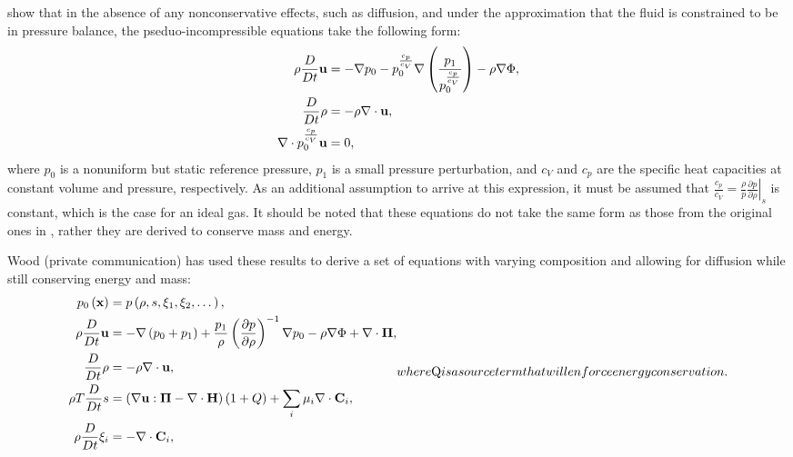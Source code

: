 \citet{Vasil2013} show that in the absence of any nonconservative effects, such as diffusion, and under the approximation that the fluid is constrained to be in pressure balance, the pseduo-incompressible equations take the following form:
\begin{subequations}
	\begin{align}
		\rho\frac{D}{Dt}\mathbf{u}&=-\nabla p_{0}-p_{0}^{\frac{c_{p}}{c_{V}}}\nabla\left(\frac{p_{1}}{p_{0}^{\frac{c_{p}}{c_{V}}}}\right)-\rho\nabla\Phi,\\
		\frac{D}{Dt}\rho&=-\rho\nabla\cdot\mathbf{u},\\
		\nabla\cdot p_{0}^{\frac{c_{p}}{c_{V}}}\mathbf{u}&=0,
	\end{align}
\end{subequations}
where $p_{0}$ is a nonuniform but static reference pressure, $p_{1}$ is a small pressure perturbation, and $c_{V}$ and $c_{p}$ are the specific heat capacities at constant volume and pressure, respectively.
As an additional assumption to arrive at this expression, it must be assumed that $\frac{c_{p}}{c_{V}}=\frac{\rho}{p}\left.\frac{\partial p}{\partial \rho}\right|_{s}$ is constant, which is the case for an ideal gas.
It should be noted that these equations do not take the same form as those from the original ones in \citet{Durran1989}, rather they are derived to conserve mass and energy.

Wood (private communication) has used these results to derive a set of equations with varying composition and allowing for diffusion while still conserving energy and mass:
\begin{subequations}
	\begin{align}
		\label{eq:pieos}
		p_{0}\left(\vect{x}\right)&=p\left(\rho,s,\xi_{1},\xi_{2},\dots\right),\\
		\label{eq:pivelocity}
		\rho\frac{D}{Dt}\vect{u}&=-\nabla\left(p_{0}+p_{1}\right)+\frac{p_{1}}{\rho}\left(\frac{\partial p}{\partial \rho}\right)^{-1}\nabla p_{0}-\rho\nabla\Phi+\nabla\cdot\vect{\Pi},\\
		\label{eq:pidensity}
		\frac{D}{Dt}\rho&=-\rho\nabla\cdot\vect{u},\\
		\label{eq:pientropy}
		\rho T \frac{D}{Dt}s&=\left(\nabla\vect{u}:\vect{\Pi}-\nabla\cdot{\vect{H}}\right)\left(1 + Q\right) + \sum_{i}\mu_{i}\nabla\cdot\vect{C}_{i},\\
		\label{eq:picomposition}
		\rho\frac{D}{Dt}\xi_{i}&=-\nabla\cdot\vect{C}_{i},
	\end{align}
	where $Q$ is a source term that will enforce energy conservation.
\end{subequations}

